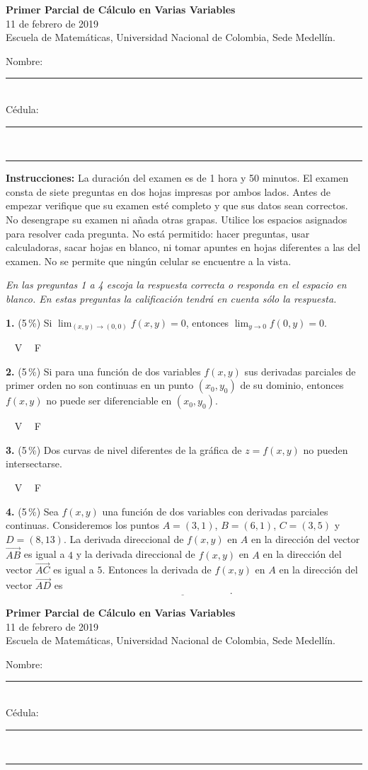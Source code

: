 \documentclass[11pt]{article}
\newcommand{\examheader}{%
  \noindent
  \begin{minipage}[t]{0.62\linewidth}
    {\bfseries\large Primer Parcial de C\'alculo en Varias Variables}\\
    {\small 11 de febrero de 2019}\\
    {\small Escuela de Matem\'aticas, Universidad Nacional de Colombia, Sede Medell\'in.}
  \end{minipage}%
  \hfill
  \begin{minipage}[t]{0.33\linewidth}
    \raggedleft\small
    Nombre: \rule{2.8cm}{0.4pt}\\[4pt]
    C\'edula: \rule{2.8cm}{0.4pt}
  \end{minipage}\\[4pt]
  \rule{\linewidth}{0.6pt}
}
\begin{document}
\examheader

\textbf{Instrucciones:} La duraci\'on del examen es de 1 hora y 50 minutos. El examen consta de siete preguntas en dos hojas impresas por ambos lados. Antes de empezar verifique que su examen est\'e completo y que sus datos sean correctos. No desengrape su examen ni a\~nada otras grapas. Utilice los espacios asignados para resolver cada pregunta. No est\'a permitido: hacer preguntas, usar calculadoras, sacar hojas en blanco, ni tomar apuntes en hojas diferentes a las del examen. No se permite que ning\'un celular se encuentre a la vista.

\bigskip

\textit{En las preguntas 1 a 4 escoja la respuesta correcta o responda en el espacio en blanco. En estas preguntas la calificaci\'on tendr\'a en cuenta s\'olo la respuesta.}

\bigskip
\noindent\textbf{1.} (5\,\%) Si $\displaystyle\lim_{(x,y)\to(0,0)} f(x,y) = 0$, entonces $\displaystyle\lim_{y\to 0} f(0,y) = 0$.

\hspace{2cm}$\boxed{\phantom{V}}$ V \qquad $\boxed{\phantom{V}}$ F

\bigskip
\noindent\textbf{2.} (5\,\%) Si para una funci\'on de dos variables $f(x,y)$ sus derivadas parciales de primer orden no son continuas en un punto $(x_0,y_0)$ de su dominio, entonces $f(x,y)$ no puede ser diferenciable en $(x_0,y_0)$.

\hspace{2cm}$\boxed{\phantom{V}}$ V \qquad $\boxed{\phantom{V}}$ F

\bigskip
\noindent\textbf{3.} (5\,\%) Dos curvas de nivel diferentes de la gr\'afica de $z=f(x,y)$ no pueden intersectarse.

\hspace{2cm}$\boxed{\phantom{V}}$ V \qquad $\boxed{\phantom{V}}$ F

\bigskip
\noindent\textbf{4.} (5\,\%) Sea $f(x,y)$ una funci\'on de dos variables con derivadas parciales continuas. Consideremos los puntos $A=(3,1)$, $B=(6,1)$, $C=(3,5)$ y $D=(8,13)$. La derivada direccional de $f(x,y)$ en $A$ en la direcci\'on del vector $\overrightarrow{AB}$ es igual a $4$ y la derivada direccional de $f(x,y)$ en $A$ en la direcci\'on del vector $\overrightarrow{AC}$ es igual a $5$. Entonces la derivada de $f(x,y)$ en $A$ en la direcci\'on del vector $\overrightarrow{AD}$ es
$$\underline{\hspace{4cm}}.$$

\newpage
\examheader
\vspace{2pt}
\end{document}
